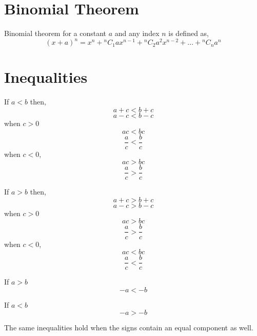 \documentclass[a4paper]{book}
\begin{document}
\section{Binomial Theorem}
Binomial theorem for a constant $a$ and any index $n$ is defined as,
\begin{equation}
(x + a)^{n} = x^{n} + {}^{n}C_{1}ax^{n - 1} + {}^{n}C_{2}a^{2}x^{n - 2} + ... + {}^{n}C_{n}a^{n}
\end{equation}

\section{Inequalities}
\begin{description}
\item If $a < b$ then,
\begin{equation}
a + c < b + c
\end{equation}
\begin{equation}
a - c < b - c
\end{equation}
when $c > 0$
\begin{equation}
ac < bc
\end{equation}
\begin{equation}
\frac{a}{c} < \frac{b} {c}
\end{equation}
when $c < 0$,
\begin{equation}
ac > bc
\end{equation}
\begin{equation}
\frac{a}{c} > \frac{b} {c}
\end{equation}

\item If $a > b$ then,
\begin{equation}
a + c > b + c
\end{equation}
\begin{equation}
a - c > b - c
\end{equation}
when $c > 0$
\begin{equation}
ac > bc
\end{equation}
\begin{equation}
\frac{a}{c} > \frac{b} {c}
\end{equation}
when $c < 0$,
\begin{equation}
ac < bc
\end{equation}
\begin{equation}
\frac{a}{c} < \frac{b} {c}
\end{equation}
\item If $a > b$
\begin{equation}
-a < -b
\end{equation}
\item If $a < b$
\begin{equation}
-a > -b
\end{equation}
\end{description}
The same inequalities hold when the signs contain an equal component as well.
\end{document}
